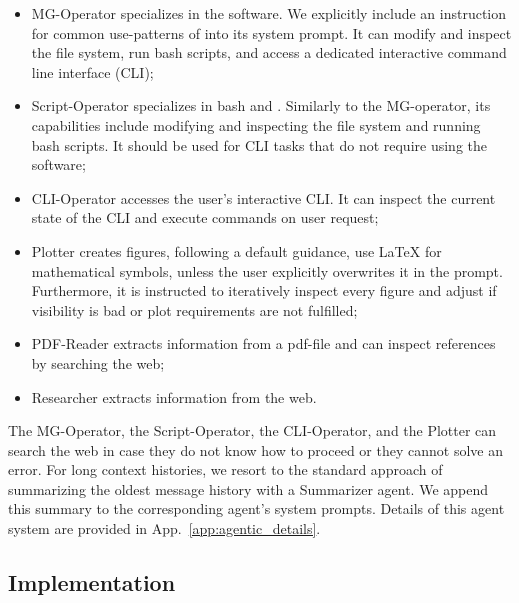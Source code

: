 \documentclass[submission, Phys]{SciPost}
\begin{document}
\begin{enumerate}
  \begin{itemize}
  \item MG-Operator  specializes in the \mg software. We explicitly include an instruction for common use-patterns of \mg into its system prompt. It can modify and inspect the file system, run bash scripts, and access a dedicated interactive command line interface (CLI);
  \item Script-Operator specializes in bash and \python. Similarly to the MG-operator, its capabilities include modifying and inspecting the file system and running bash scripts. It should be used for CLI tasks that do not require using the \mg software;
  \item CLI-Operator accesses the user's interactive CLI. It can inspect the current state of the CLI and execute commands on user request;
  \item Plotter creates figures, following a default guidance, \eg use LaTeX for mathematical symbols, unless the user explicitly overwrites it in the prompt. Furthermore, it is instructed to iteratively inspect every figure and adjust if visibility is bad or plot requirements are not fulfilled;
  \item PDF-Reader extracts information from a pdf-file and can inspect references by searching the web;
  \item Researcher extracts information from the web.
  \end{itemize}
\end{enumerate}
%    
The MG-Operator, the Script-Operator, the CLI-Operator, and the Plotter can search the web in case they do not know how to proceed or they cannot solve an error. For long context histories, we resort to the standard approach of summarizing the oldest message history with a Summarizer agent. We append this summary to the corresponding agent's system prompts. Details of this agent system are provided in App.~\ref{app:agentic_details}.

\subsection{Implementation}
\end{document}
